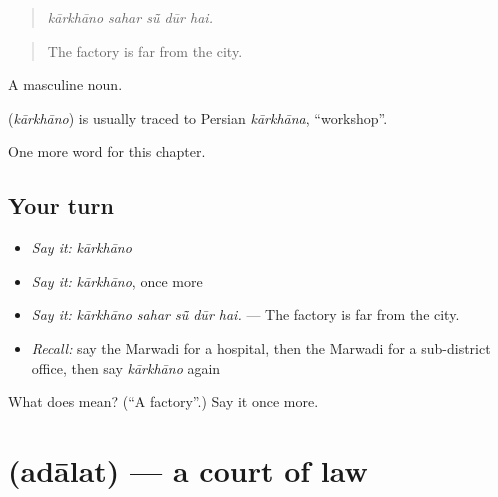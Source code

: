 \begin{quote}
    
\end{quote}

\begin{quote}
\emph{kārkhāno sahar sū̃ dūr hai.}
\end{quote}

\begin{quote}
The factory is far from the city.
\end{quote}

A masculine noun.

\begin{cousinweb}
\textbf{} (\emph{kārkhāno}) is usually traced to Persian \emph{kārkhāna}, \textquotedblleft{}workshop\textquotedblright{}.
\end{cousinweb}

\begin{grammarlens}[title={What you've built}]
One more word for this chapter.
\end{grammarlens}

\subsection*{Your turn}
\begin{itemize}
\raggedright
  \item \emph{Say it:} \emph{kārkhāno}
  \item \emph{Say it:} \emph{kārkhāno}, once more
  \item \emph{Say it:} \emph{kārkhāno sahar sū̃ dūr hai.} — The factory is far from the city.
  \item \emph{Recall:} say the Marwadi for a hospital, then the Marwadi for a sub-district office, then say \emph{kārkhāno} again
\end{itemize}

\begin{tcolorbox}[breakable,colback=teal!4,colframe=teal!35!black,title={Before you move on}]
What does  mean? (\textquotedblleft{}A factory\textquotedblright{}.) Say it once more.
\end{tcolorbox}
\section[\texorpdfstring{\mw{अदालत} (adālat)}{अदालत (adālat)}]{ (adālat) — a court of law}

\label{lesson:MW-C208-adalat}



